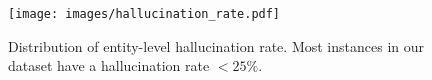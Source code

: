 \begin{figure}[t]
    \centering
    \texttt{[image: images/hallucination\_rate.pdf]}
    \caption{Distribution of entity-level hallucination rate. Most instances in our dataset have a hallucination rate $<25\%$.}
    \label{fig:hallucination_dist}
\end{figure}